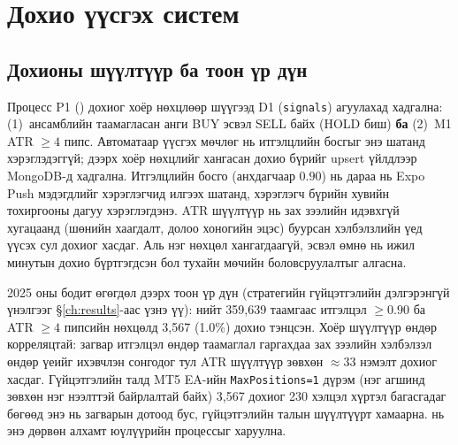 \section{Дохио үүсгэх систем}

\subsection{Дохионы шүүлтүүр ба тоон үр дүн}
\label{sec:signal_filter}

Процесс P1 () дохиог хоёр нөхцлөөр шүүгээд D1 (\texttt{signals}) агуулахад хадгална: (1)~ансамблийн таамагласан анги BUY эсвэл SELL байх (HOLD биш) \textbf{ба} (2)~M1 ATR $\geq 4$ пипс. Автоматаар үүсгэх мөчлөг нь итгэлцлийн босгыг энэ шатанд хэрэглэдэггүй; дээрх хоёр нөхцлийг хангасан дохио бүрийг upsert үйлдлээр MongoDB-д хадгална. Итгэлцлийн босго (анхдагчаар $0.90$) нь дараа нь Expo Push мэдэгдлийг хэрэглэгчид илгээх шатанд, хэрэглэгч бүрийн хувийн тохиргооны дагуу хэрэглэгдэнэ. ATR шүүлтүүр нь зах зээлийн идэвхгүй хугацаанд (шөнийн хаагдалт, долоо хоногийн эцэс) буурсан хэлбэлзлийн үед үүсэх сул дохиог хасдаг. Аль нэг нөхцөл хангагдаагүй, эсвэл өмнө нь ижил минутын дохио бүртгэгдсэн бол тухайн мөчийн боловсруулалтыг алгасна.

2025 оны бодит өгөгдөл дээрх тоон үр дүн (стратегийн гүйцэтгэлийн дэлгэрэнгүй үнэлгээг §\ref{ch:results}-аас үзнэ үү): нийт 359{,}639 таамгаас итгэлцэл $\geq\!0.90$ ба ATR $\geq\!4$ пипсийн нөхцөлд 3{,}567 (1.0\%) дохио тэнцсэн. Хоёр шүүлтүүр өндөр корреляцтай: загвар итгэлцэл өндөр таамаглал гаргахдаа зах зээлийн хэлбэлзэл өндөр үеийг ихэвчлэн сонгодог тул ATR шүүлтүүр зөвхөн $\approx$33 нэмэлт дохиог хасдаг. Гүйцэтгэлийн талд MT5 EA-ийн \texttt{MaxPositions=1} дүрэм (нэг агшинд зөвхөн нэг нээлттэй байрлалтай байх) 3{,}567 дохиог 230 хэлцэл хүртэл багасгадаг бөгөөд энэ нь загварын дотоод бус, гүйцэтгэлийн талын шүүлтүүрт хамаарна.  нь энэ дөрвөн алхамт юүлүүрийн процессыг харуулна.

